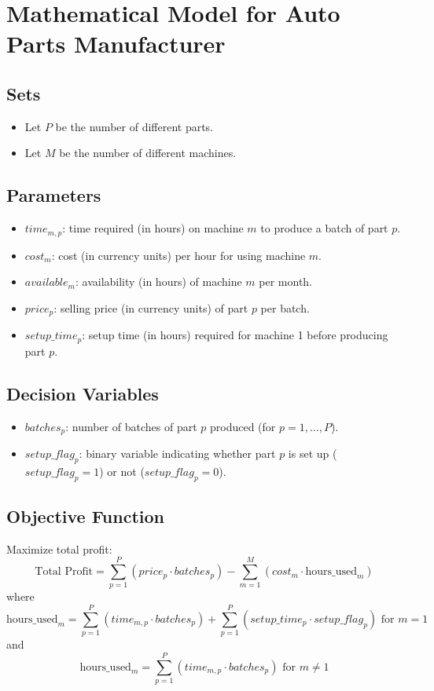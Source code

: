 \documentclass{article}
\begin{document}
\section*{Mathematical Model for Auto Parts Manufacturer}

\subsection*{Sets}
\begin{itemize}
    \item Let \( P \) be the number of different parts.
    \item Let \( M \) be the number of different machines.
\end{itemize}

\subsection*{Parameters}
\begin{itemize}
    \item \( time_{m,p} \): time required (in hours) on machine \( m \) to produce a batch of part \( p \).
    \item \( cost_{m} \): cost (in currency units) per hour for using machine \( m \).
    \item \( available_{m} \): availability (in hours) of machine \( m \) per month.
    \item \( price_{p} \): selling price (in currency units) of part \( p \) per batch.
    \item \( setup\_time_{p} \): setup time (in hours) required for machine 1 before producing part \( p \).
\end{itemize}

\subsection*{Decision Variables}
\begin{itemize}
    \item \( batches_{p} \): number of batches of part \( p \) produced (for \( p = 1, \ldots, P \)).
    \item \( setup\_flag_{p} \): binary variable indicating whether part \( p \) is set up (\( setup\_flag_{p} = 1 \)) or not (\( setup\_flag_{p} = 0 \)).
\end{itemize}

\subsection*{Objective Function}
Maximize total profit:
\[
\text{Total Profit} = \sum_{p=1}^{P} (price_{p} \cdot batches_{p}) - \sum_{m=1}^{M} (cost_{m} \cdot \text{hours\_used}_{m})
\]
where 
\[
\text{hours\_used}_{m} = \sum_{p=1}^{P} (time_{m,p} \cdot batches_{p}) + \sum_{p=1}^{P} (setup\_time_{p} \cdot setup\_flag_{p}) \text{ for } m = 1
\]
and 
\[
\text{hours\_used}_{m} = \sum_{p=1}^{P} (time_{m,p} \cdot batches_{p}) \text{ for } m \neq 1
\]
\end{document}
